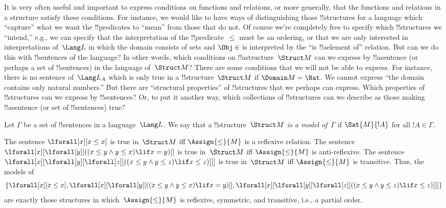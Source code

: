 \documentclass[../../include/open-logic-section]{subfiles}
\begin{document}


\begin{explain}
It is very often useful and important to express conditions on
functions and relations, or more generally, that the functions and
relations in a structure satisfy these conditions.  For instance, we
would like to have ways of distinguishing those !!{structure}s for a
language which ``capture'' what we want the !!{predicate}s to ``mean''
from those that do not.  Of course we're completely free to specify
which !!{structure}s we ``intend,'' e.g., we can specify that the
interpretation of the !!{predicate}~$\le$ must be an ordering, or that
we are only interested in interpretations of~$\Lang L$ in which the
domain consists of sets and $\Obj \in$ is interpreted by the ``is
!!a{element} of'' relation.  But can we do this with !!{sentence}s of
the language? In other words, which conditions on
!!a{structure}~$\Struct M$ can we express by !!a{sentence} (or perhaps
a set of !!{sentence}s) in the language of~$\Struct M$?  There are
some conditions that we will not be able to express.  For instance,
there is no sentence of~$\Lang L_A$ which is only true in a
!!{structure}~$\Struct M$ if $\Domain M = \Nat$.  We cannot express
``the domain contains only natural numbers.''  But there are
``structural properties'' of !!{structure}s that we perhaps can
express.  Which properties of !!{structure}s can we express by
!!{sentence}s? Or, to put it another way, which collections of
!!{structure}s can we describe as those making !!a{sentence} (or set
of !!{sentence}s) true?
\end{explain}

\begin{defn}
Let $\Gamma$ be a set of !!{sentence}s in a language~$\Lang L$.  We
say that a !!{structure}~$\Struct M$ \emph{is a model of}~$\Gamma$ if
$\Sat{M}{!A}$ for all $!A \in \Gamma$.
\end{defn}

\begin{ex}
The sentence $\lforall[x][x \le x]$ is true in~$\Struct M$ iff
$\Assign{\le}{M}$ is a reflexive relation. The sentence
$\lforall[x][\lforall[y][((x \le y \land y \le x) \lif x = y)]]$ is
true in~$\Struct M$ iff $\Assign{\le}{M}$ is anti-reflexive.  The
sentence $\lforall[x][\lforall[y][\lforall[z][((x \le y \land y \le z)
      \lif x \le z)]]]$ is true in~$\Struct M$ iff $\Assign{\le}{M}$
is transitive.  Thus, the models of
\[
\{\lforall[x][x \le x], \lforall[x][\lforall[y][((x \le y \land y \le
    x) \lif x = y)]], \lforall[x][\lforall[y][\lforall[z][((x \le y
      \land y \le z) \lif x \le z)]]]\}
\]
are exactly those structures in which~$\Assign{\le}{M}$ is reflexive,
symmetric, and transitive, i.e., a partial order.
\end{ex}
\end{document}
